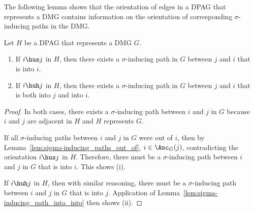 The following lemma shows that the orientation of edges in a DPAG that represents a DMG contains
information on the orientation of corresponding $\sigma$-inducing paths in the DMG.
\begin{Lem}\label{lem:sigma-inducing_path_into}
  Let $H$ be a DPAG that represents a DMG $G$. 
  \begin{enumerate}[label=(\roman*)]
    \item If $i \hus j$ in $H$, then there exists a $\sigma$-inducing path in $G$ between $j$ and $i$ that is into $i$.
    \item If $i \huh j$ in $H$, then there exists a $\sigma$-inducing path in $G$ between $j$ and $i$ that is both into $j$ and into $i$.
  \end{enumerate}
\end{Lem}
\begin{proof}
  In both cases, there
  exists a $\sigma$-inducing path between $i$ and $j$ in $G$ because $i$ and $j$ are adjacent in $H$ and $H$ represents $G$.

  If all $\sigma$-inducing paths between $i$ and $j$ in $G$ were out of $i$, then by Lemma~\ref{lem:sigma-inducing_paths_out_of},
  $i \in \Anc_G(j)$, contradicting the orientation $i \hus j$ in $H$. 
  Therefore, there must be a $\sigma$-inducing path between $i$ and $j$ in $G$ that is into $i$.
  This shows (i).

  If $i \huh j$ in $H$, then with similar reasoning, there must be a $\sigma$-inducing path between $i$ and $j$ in $G$ that is into $j$.
  Application of Lemma~\ref{lem:sigma-inducing_path_into_into} then shows (ii).
\end{proof}
